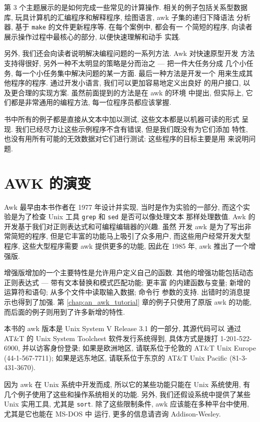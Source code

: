 第 3 个主题展示的是如何完成一些常见的计算操作. 相关的例子包括关系型数据
库, 玩具计算机的汇编程序和解释程序, 绘图语言, awk 子集的递归下降语法
分析器, 基于 \texttt{make} 的文件更新程序等. 在每个案例中, 都会有一
个简短的程序, 向读者展示操作过程中最核心的部分, 以便快速理解和动手
实践.

另外, 我们还会向读者说明解决编程问题的一系列方法. Awk 对快速原型开发
方法支持得很好, 另外一种不太明显的策略是分而治之 --- 把一件大任务分成
几个小任务, 每一个小任务集中解决问题的某一方面. 最后一种方法是开发一个
用来生成其他程序的程序. 通过开发小语言, 我们可以更加容易地定义出良好
的用户接口, 以及更合理的实现方案. 虽然前面提到的方法是在 awk 的环境
中提出, 但实际上, 它们都是非常通用的编程方法, 每一位程序员都应该掌握.

书中所有的例子都是直接从文本中加以测试, 这些文本都是以机器可读的形式
呈现. 我们已经尽力让这些示例程序不含有错误, 但是我们既没有为它们添加
特性, 也没有用所有可能的无效数据对它们进行测试: 这些程序的目标主要是用
来说明问题.

\section*{AWK 的演变}

Awk 最早由本书作者在 1977 年设计并实现, 当时是作为实验的一部分, 而这个实
验是为了检查 Unix 工具 \texttt{grep} 和 \texttt{sed} 是否可以像处理文本
那样处理数值. Awk 的开发基于我们对正则表达式和可编程编辑器的兴趣. 虽然
开发 awk 是为了写出非常简短的程序, 但是它丰富的功能马上吸引了众多用户,
而这些用户经常开发大型程序, 这些大型程序需要 awk 提供更多的功能, 因此在
1985 年, awk 推出了一个增强版.

增强版增加的一个主要特性是允许用户定义自己的函数.
其他的增强功能包括动态正则表达式 --- 带有文本替换和模式匹配功能; 更丰富
的内建函数与变量; 新增的运算符和语句; 从多个文件中读取输入数据; 命令行
参数的支持. 出错时的消息提示也得到了加强. 第 \ref{chap:an_awk_tutorial}
章的例子只使用了原版 awk 的功能, 而后面的例子则用到了许多新增的特性.

本书的 awk 版本是 Unix System V Release 3.1 的一部分, 其源代码可以
通过 AT\&T 的 Unix System Toolchest 软件发行系统得到, 具体方式是拨打
1-201-522-6900, 并以访客身份登录; 如果是欧洲地区, 请联系位于伦敦的 AT\&T
Unix Europe (44-1-567-7711); 如果是远东地区, 请联系位于东京的
AT\&T Unix Pacific (81-3-431-3670).

因为 awk 在 Unix 系统中开发而成, 所以它的某些功能只能在 Unix 系统使用,
有几个例子使用了这些和操作系统相关的功能.
另外, 我们还假设系统中提供了某些 Unix 实用工具, 尤其是  \texttt{sort}.
除了这些限制条件, awk 应该能在多种平台中使用, 尤其是它也能在 MS-DOS 中
运行, 更多的信息请咨询 Addison-Wesley.

